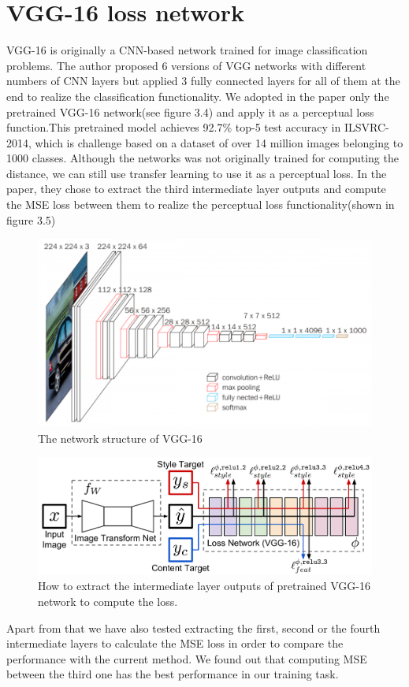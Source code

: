 \documentclass[a4paper,12pt,twoside]{report}
\begin{document}
\section{VGG-16 loss network}

VGG-16\cite{simonyan2014very} is originally a CNN-based network trained for image classification problems. The author proposed 6 versions of VGG networks with different numbers of CNN layers but applied 3 fully connected layers for all of them at the end to realize the classification functionality. We adopted in the paper only the pretrained VGG-16 network(see figure 3.4) and apply it as a perceptual loss function.This pretrained model achieves 92.7\% top-5 test accuracy in ILSVRC-2014, which is challenge based on a dataset of over 14 million images belonging to 1000 classes. Although the networks was not originally trained for computing the distance, we can still use transfer learning to use it as a perceptual loss. In the paper\cite{johnson2016perceptual}, they chose to extract the third intermediate layer outputs and compute the MSE loss between them to realize the perceptual loss functionality(shown in figure 3.5)
\begin{figure}
\centering
\includegraphics[width=1.0\textwidth]{vgg16.png}
\caption{The network structure of VGG-16}
\end{figure}
\begin{figure}
\centering
\includegraphics[width=1.0\textwidth]{SystemFigure.pdf}
\caption{How to extract the intermediate layer outputs of pretrained VGG-16 network to compute the loss.\cite{johnson2016perceptual}}
\end{figure}
Apart from that we have also tested extracting the first, second or the fourth intermediate layers to calculate the MSE loss in order to compare the performance with the current method. We found out that computing MSE between the third one has the best performance in our training task.
\end{document}
